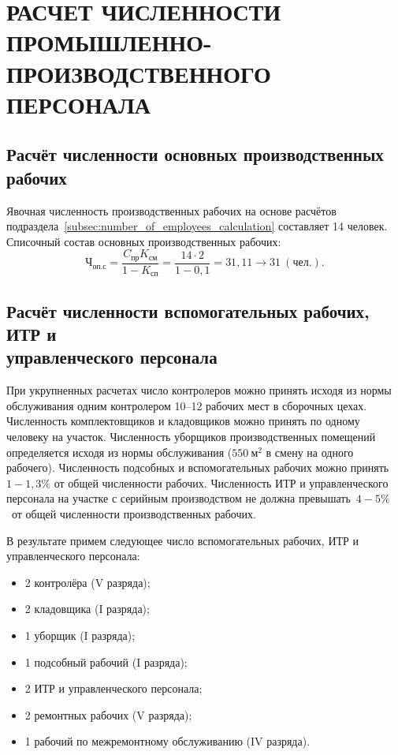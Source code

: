 \section[Расчёт численности промышленно-производственного персонала]
{РАСЧЕТ ЧИСЛЕННОСТИ \\ ПРОМЫШЛЕННО-ПРОИЗВОДСТВЕННОГО \\ ПЕРСОНАЛА}
\label{sec:number}

\subsection[Расчёт численности основных производственных рабочих]
{Расчёт численности основных производственных рабочих}

Явочная численность производственных рабочих на основе расчётов
подраздела~\ref{subsec:number_of_employees_calculation} составляет 14 человек.
Списочный состав основных производственных рабочих:
\begin{equation*}
  \text{Ч}_{\text{оп.с}} =
    \dfrac{C_{\text{пр}}K_{см}}{1-K_{\text{сп}}} =
    \dfrac{14 \cdot 2}{1-0{,}1} =
    31{,}11 \rightarrow 31~(\text{чел.}).
\end{equation*}


\subsection[Расчёт численности вспомогательных рабочих, ИТР и УП]
{Расчёт численности вспомогательных рабочих, ИТР и \\
управленческого персонала}

При укрупненных расчетах число контролеров можно принять исходя из нормы
обслуживания одним контролером 10--12 рабочих мест в сборочных цехах.
Численность комплектовщиков и кладовщиков можно принять по одному человеку
на участок. Численность уборщиков производственных
помещений определяется исходя из нормы обслуживания ($550~\text{м}^2$ в смену
на одного рабочего). Численность подсобных и вспомогательных рабочих можно
принять~$1-1{,}3\%$ от общей численности рабочих.
Численность ИТР и управленческого персонала на участке с серийным производством
не должна превышать~$4-5\%$~от общей численности производственных рабочих.

В результате примем следующее число вспомогательных рабочих,
ИТР и управленческого персонала:

\begin{itemize}
  \item 2 контролёра (V разряда);
  \item 2 кладовщика (I разряда);
  \item 1 уборщик (I разряда);
  \item 1 подсобный рабочий (I разряда);
  \item 2 ИТР и управленческого персонала;
  \item 2 ремонтных рабочих (V разряда);
  \item 1 рабочий по межремонтному обслуживанию (IV разряда).
\end{itemize}

